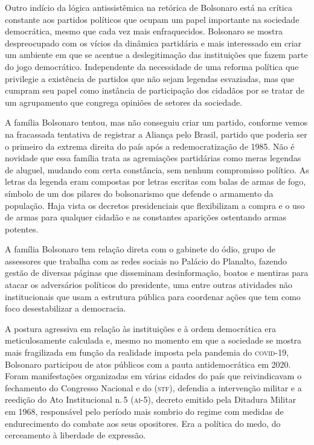Outro indício da lógica antissistêmica na retórica de Bolsonaro está na
crítica constante aos partidos políticos que ocupam um papel importante
na sociedade democrática, mesmo que cada vez mais enfraquecidos.
Bolsonaro se mostra despreocupado com os vícios da dinâmica partidária e
mais interessado em criar um ambiente em que se acentue a deslegitimação
das instituições que fazem parte do jogo democrático. Independente da
necessidade de uma reforma política que privilegie a existência de
partidos que não sejam legendas esvaziadas, mas que cumpram seu papel
como instância de participação dos cidadãos por se tratar de um
agrupamento que congrega opiniões de setores da sociedade.

A família Bolsonaro tentou, mas não conseguiu criar um partido, conforme
vemos na fracassada tentativa de registrar a Aliança pelo Brasil,
partido que poderia ser o primeiro da extrema direita do país após a
redemocratização de 1985. Não é novidade que essa família trata as
agremiações partidárias como meras legendas de aluguel, mudando com
certa constância, sem nenhum compromisso político. As letras da legenda
eram compostas por letras escritas com balas de armas de fogo, símbolo
de um dos pilares do bolsonarismo que defende o armamento da população.
Haja vista os decretos presidenciais que flexibilizam a compra e o uso de
armas para qualquer cidadão e as constantes aparições ostentando armas
potentes.

A família Bolsonaro tem relação direta com o gabinete do ódio, grupo de
assessores que trabalha com as redes sociais no Palácio do Planalto,
fazendo gestão de diversas páginas que disseminam desinformação, boatos
e mentiras para atacar os adversários políticos do presidente, uma entre
outras atividades não institucionais que usam a estrutura pública para
coordenar ações que tem como foco desestabilizar a democracia.

A postura agressiva em relação às instituições e à ordem democrática era
meticulosamente calculada e, mesmo no momento em que a sociedade se
mostra mais fragilizada em função da realidade imposta pela pandemia do
\textsc{covid-19}, Bolsonaro participou de atos públicos com a pauta
antidemocrática em 2020. Foram manifestações organizadas em várias
cidades do país que reivindicavam o fechamento do Congresso Nacional e
do (\textsc{stf}), defendia a intervenção militar e a
reedição do Ato Institucional n.\,5 (\textsc{ai-5}), decreto emitido pela Ditadura
Militar em 1968, responsável pelo período mais sombrio do regime com
medidas de endurecimento do combate aos seus opositores. Era a política
do medo, do cerceamento à liberdade de expressão.

